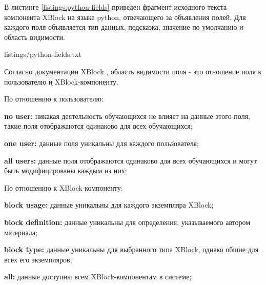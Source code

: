 В листинге \ref{listings:python-fields} приведен фрагмент исходного текста компонента XBlock на языке python, отвечающего за объявления полей. Для каждого поля объявляется тип данных, подсказка, значение по умолчанию и область видимости.


{listings/python-fields.txt}

Согласно документации XBlock \cite{xblock-scope}, область видимости поля - это отношение поля к пользователю и XBlock-компоненту. 

По отношению к пользователю: 

\begin{itemize*}
	\item \textbf{no user:} никакая деятельность обучающихся не влияет на данные этого поля, такие поля отображаются одинаково для всех обучающихся;
	\item \textbf{one user:} данные поля уникальны для каждого пользователя;
	\item \textbf{all users:} данные поля отображаются одинаково для всех обучающихся и могут быть модифицированы каждым из них;
\end{itemize*}

По отношению к XBlock-компоненту: 

\begin{itemize*}
	\item \textbf{block usage:} данные уникальны для каждого экземпляра XBlock;
	\item \textbf{block definition:} данные уникальны для определения, указываемого автором материала;
	\item \textbf{block type:} данные уникальны для выбранного типа XBlock, однако общие для всех его экземпляров;
	\item \textbf{all:} данные доступны всем XBlock-компонентам в системе;
\end{itemize*}

